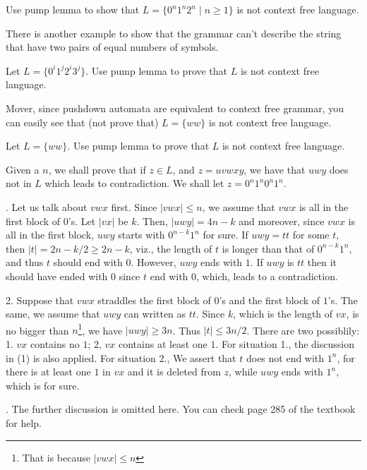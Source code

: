\documentclass[../main.tex]{subfiles}
\begin{document}
\begin{exam}
	Use pump lemma to show that \(L = \{ 0 ^{n} 1 ^{n} 2 ^{n} \mid n \ge 1 \}\) is not context free language.
\end{exam}
There is another example to show that the grammar can't describe the string that have two pairs of equal numbers of symbols. 
\begin{exam}
	Let \(L = \{ 0 ^{i} 1 ^{j} 2 ^{i} 3 ^{j} \}\). Use pump lemma to prove that \(L\) is not context free language. 
\end{exam}
Mover, since pushdown automata are equivalent to context free grammar, you can easily see that (not prove that) 
\(L =  \{ ww\}\) is not context  free language. 
\begin{exam}
	Let \(L = \{ ww \}\). Use pump lemma to prove that \(L\) is not context free language.

	Given a \(n\), we shall prove that if \(z \in L\), and \(z  =  uv w xy\), we have that \( u w y\) does not in \(L\) which leads to
	contradiction.  We shall let \(z =  0 ^{n} 1 ^{n} 0 ^{n} 1 ^{n}\). 

	\setlength{\hangindent}{33pt} 
	. Let us talk about \( v w x \) first. Since \( |v w x | \le n\), we assume that \(v w x \) is all in the first 
	block of \(0\)'s. Let \( |v x |\) be \(k\). Then, \( |  u w y | = 4n - k\) and moreover, since \(v w x\) is all 
	in the first block, \( u w y \) starts with \( 0 ^{n - k} 1 ^{n}\) for sure. If \( u w  y = tt\) for some \(t\),
	then \( |t| = 2n - k/2 \ge 2n - k\), viz., the length of \(t\) is longer than that of \( 0 ^{n - k} 1 ^{n}\), and 
	thus \(t\) should end with \(0\). However, \( uwy \) ends with \(1\). If \( u wy\) is \(tt\) then it should have ended 
	with \(0\) since \(t\) end with \(0\), which, leads to a contradiction.
	\medskip

	2. Suppose that \( v w x\) straddles the first block of \(0\)'s and the first block of \(1\)'s.	
	The same, we assume that \( u w y\) can written as \(tt\). Since \(k\), which is the length of 
	\(v x\), is no bigger than \(n\)\footnote{That is because \(|v w x| \le n\)}, we have \( |uwy| \ge 3n\).
	Thus \( |t | \le 3n / 2\). There are two possiblily: 1. \( v x \) contains no \(1\); 2, \(v x\) contains 
	at least one \(1\). For situation 1., the discussion in (1) is also applied. For situation 2., We assert 
	that \(t\) does not end with \(1 ^{n}\), for there is at least one \(1\) in \(v x\) and it is deleted from 
	\(z\), while \( uw y\) ends with \(1^{n}\), which is for sure.

	. The further discussion is omitted here.  You can check page 285 of the textbook for help.
\end{exam}
\end{document}
